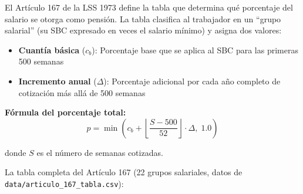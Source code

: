 \documentclass[11pt,a4paper]{report}
\begin{document}
\begin{tcolorbox}[colback=blue!5!white, colframe=blue!75!black, title=\textbf{Definici\'on Formal}]
El Art\'iculo 167 de la LSS 1973 define la tabla que determina qu\'e porcentaje del salario se otorga como pensi\'on. La tabla clasifica al trabajador en un ``grupo salarial'' (su SBC expresado en veces el salario m\'inimo) y asigna dos valores:

\begin{itemize}[nosep]
\item \textbf{Cuant\'ia b\'asica} ($c_b$): Porcentaje base que se aplica al SBC para las primeras 500 semanas
\item \textbf{Incremento anual} ($\Delta$): Porcentaje adicional por cada a\~no completo de cotizaci\'on m\'as all\'a de 500 semanas
\end{itemize}

\textbf{F\'ormula del porcentaje total:}
\[
p = \min\left(c_b + \left\lfloor\frac{S - 500}{52}\right\rfloor \cdot \Delta,\; 1.0\right)
\]

donde $S$ es el n\'umero de semanas cotizadas.

La tabla completa del Art\'iculo 167 (22 grupos salariales, datos de \texttt{data/articulo\_167\_tabla.csv}):


\end{tcolorbox}
\end{document}
